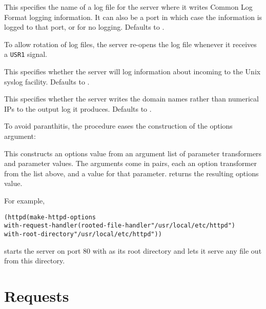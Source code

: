 \begin{desc}
  This specifies the name of a log file for the server where it writes
  Common Log Format logging information.  It can also be a port in
  which case the information is logged to that port, or  for
  no logging.  Defaults to .
  
  To allow rotation of log files, the server re-opens the log file
  whenever it receives a \texttt{USR1} signal.
\end{desc}

\begin{desc}
  This specifies whether the server will log information about
  incoming to the Unix syslog facility.  Defaults to .
\end{desc}

\begin{desc}
  This specifies whether the server writes the domain names rather
  than numerical IPs to the output log it produces.  Defaults to
  .
\end{desc}

To avoid paranthitis, the  procedure eases the
construction of the options argument:

\begin{desc}
  This constructs an options value from an argument list of parameter
  transformers and parameter values.  The arguments come in pairs,
  each an option transformer from the list above, and a value for that
  parameter.   returns the resulting options value.
\end{desc}

For example,
\begin{alltt}
(httpd (make-httpd-options
         with-request-handler (rooted-file-handler "/usr/local/etc/httpd")
         with-root-directory "/usr/local/etc/httpd"))
\end{alltt}
  starts the server on port 80 with
   as its root directory and
  lets it serve any file out from this directory.


\section{Requests}
\label{httpd:requests}

